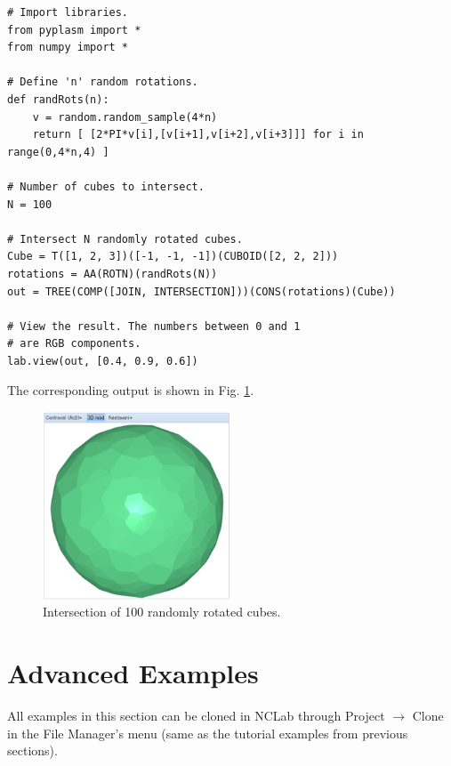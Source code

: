 \documentclass[article,A4,12pt]{llncs}
\begin{document}
{\small
\begin{verbatim}
# Import libraries.
from pyplasm import *
from numpy import *

# Define 'n' random rotations.
def randRots(n):
    v = random.random_sample(4*n)
    return [ [2*PI*v[i],[v[i+1],v[i+2],v[i+3]]] for i in range(0,4*n,4) ]

# Number of cubes to intersect.
N = 100
  
# Intersect N randomly rotated cubes.
Cube = T([1, 2, 3])([-1, -1, -1])(CUBOID([2, 2, 2]))
rotations = AA(ROTN)(randRots(N))
out = TREE(COMP([JOIN, INTERSECTION]))(CONS(rotations)(Cube))

# View the result. The numbers between 0 and 1 
# are RGB components.
lab.view(out, [0.4, 0.9, 0.6])
\end{verbatim}
}
\noindent
The corresponding output is shown in Fig. \ref{fig:random_cubes}.

\begin{figure}[!ht]
\begin{center}
\includegraphics[width=0.5\textwidth]{img/random_cubes.png}
\end{center}
\vspace{-2mm}
\caption{Intersection of 100 randomly rotated cubes.}
\label{fig:random_cubes}
\end{figure}
\noindent







\section{Advanced Examples}

All examples in this section can be cloned in NCLab through 
Project $\rightarrow$ Clone in the File Manager's menu (same
as the tutorial examples from previous sections).
 
\end{document}
